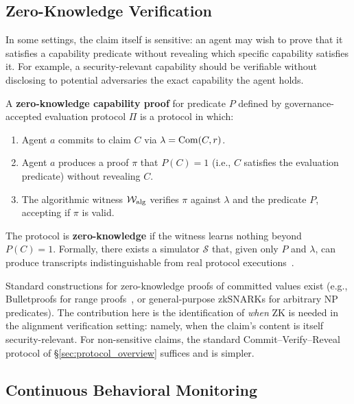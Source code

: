 \subsection{Zero-Knowledge Verification}
\label{sec:zk_verification}

In some settings, the claim itself is sensitive: an agent may wish to
prove that it satisfies a capability predicate without revealing which
specific capability satisfies it.  For example, a security-relevant
capability should be verifiable without disclosing to potential
adversaries the exact capability the agent holds.

\begin{definition}
\label{def:zk_proof}
A \textbf{zero-knowledge capability proof} for predicate $P$ defined
by governance-accepted evaluation protocol $\Pi$ is a protocol in which:
\begin{enumerate}
    \item Agent $a$ commits to claim $C$ via $\lambda = \mathrm{Com}(C, r)$.
    \item Agent $a$ produces a proof $\pi$ that $P(C) = 1$ (i.e., $C$
    satisfies the evaluation predicate) without revealing $C$.
    \item The algorithmic witness $\mathcal{W}_{\mathrm{alg}}$ verifies
    $\pi$ against $\lambda$ and the predicate $P$, accepting if $\pi$
    is valid.
\end{enumerate}
The protocol is \textbf{zero-knowledge} if the witness learns nothing
beyond $P(C) = 1$.  Formally, there exists a simulator $\mathcal{S}$
that, given only $P$ and $\lambda$, can produce transcripts
indistinguishable from real protocol executions~\citep{goldwasser1989knowledge}.
\end{definition}

Standard constructions for zero-knowledge proofs of committed values
exist (e.g., Bulletproofs for range proofs~\citep{bunz2018bulletproofs},
or general-purpose zkSNARKs for arbitrary NP predicates).  The
contribution here is the identification of
\emph{when} ZK is needed in the alignment verification setting: namely,
when the claim's content is itself security-relevant.  For non-sensitive
claims, the standard Commit--Verify--Reveal protocol of
\S\ref{sec:protocol_overview} suffices and is simpler.

\subsection{Continuous Behavioral Monitoring}
\label{sec:continuous_monitoring}

